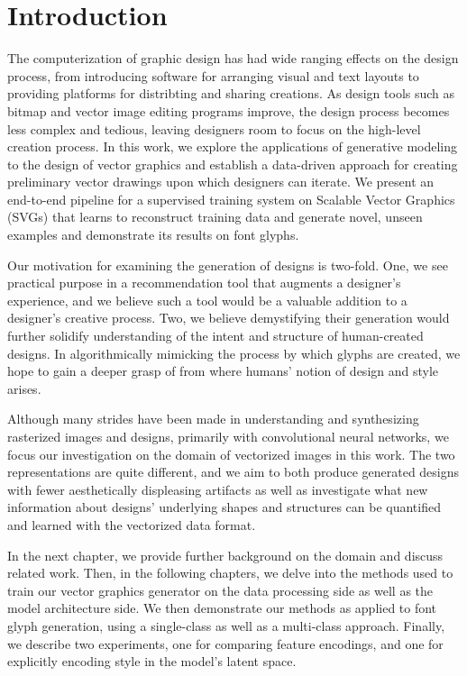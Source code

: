 \chapter{Introduction}

The computerization of graphic design has had wide ranging effects on the design process, from introducing software for arranging visual and text layouts to providing platforms for distribting and sharing creations.
As design tools such as bitmap and vector image editing programs improve, the design process becomes less complex and tedious, leaving designers room to focus on the high-level creation process.
In this work, we explore the applications of generative modeling to the design of vector graphics and establish a data-driven approach for creating preliminary vector drawings upon which designers can iterate.
We present an end-to-end pipeline for a supervised training system on Scalable Vector Graphics (SVGs) that learns to reconstruct training data and generate novel, unseen examples and demonstrate its results on font glyphs.

Our motivation for examining the generation of designs is two-fold.
One, we see practical purpose in a recommendation tool that augments a designer's experience, and we believe such a tool would be a valuable addition to a designer's creative process.
Two, we believe demystifying their generation would further solidify understanding of the intent and structure of human-created designs.
In algorithmically mimicking the process by which glyphs are created, we hope to gain a deeper grasp of from where humans' notion of design and style arises.

Although many strides have been made in understanding and synthesizing rasterized images and designs, primarily with convolutional neural networks, we focus our investigation on the domain of vectorized images in this work.
The two representations are quite different, and we aim to both produce generated designs with fewer aesthetically displeasing artifacts as well as investigate what new information about designs' underlying shapes and structures can be quantified and learned with the vectorized data format.

In the next chapter, we provide further background on the domain and discuss related work.
Then, in the following chapters, we delve into the methods used to train our vector graphics generator on the data processing side as well as the model architecture side.
We then demonstrate our methods as applied to font glyph generation, using a single-class as well as a multi-class approach.
Finally, we describe two experiments, one for comparing feature encodings, and one for explicitly encoding style in the model's latent space.
